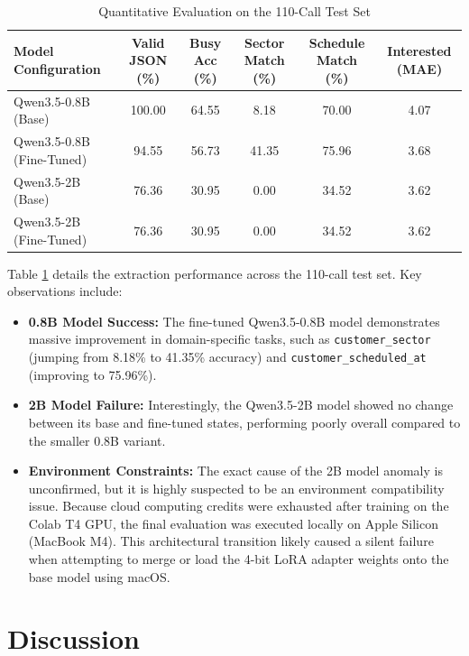 \documentclass[unnumsec,webpdf,modern,large]{oup-authoring-template}%
\theoremstyle{thmstyleone}%
\theoremstyle{thmstyletwo}%
\theoremstyle{thmstylethree}%
\begin{document}
\begin{table}[t]
\centering
\caption{Quantitative Evaluation on the 110-Call Test Set}
\begin{tabular}{@{}lccccc@{}} 
\toprule
\textbf{Model Configuration} & \textbf{Valid JSON (\%)} & \textbf{Busy Acc (\%)} & \textbf{Sector Match (\%)} & \textbf{Schedule Match (\%)} & \textbf{Interested (MAE)} \\
\midrule
Qwen3.5-0.8B (Base) & 100.00 & 64.55 & 8.18 & 70.00 & 4.07 \\
Qwen3.5-0.8B (Fine-Tuned) & 94.55 & 56.73 & 41.35 & 75.96 & 3.68 \\
\midrule
Qwen3.5-2B (Base) & 76.36 & 30.95 & 0.00 & 34.52 & 3.62 \\
Qwen3.5-2B (Fine-Tuned) & 76.36 & 30.95 & 0.00 & 34.52 & 3.62 \\
\bottomrule
\end{tabular}
\label{tab:evaluation_results}
\end{table}

Table \ref{tab:evaluation_results} details the extraction performance across the 110-call test set. Key observations include:
\begin{itemize}
    \item \textbf{0.8B Model Success:} The fine-tuned Qwen3.5-0.8B model demonstrates massive improvement in domain-specific tasks, such as \texttt{customer\_sector} (jumping from 8.18\% to 41.35\% accuracy) and \texttt{customer\_scheduled\_at} (improving to 75.96\%).
    \item \textbf{2B Model Failure:} Interestingly, the Qwen3.5-2B model showed no change between its base and fine-tuned states, performing poorly overall compared to the smaller 0.8B variant.
    \item \textbf{Environment Constraints:} The exact cause of the 2B model anomaly is unconfirmed, but it is highly suspected to be an environment compatibility issue. Because cloud computing credits were exhausted after training on the Colab T4 GPU, the final evaluation was executed locally on Apple Silicon (MacBook M4). This architectural transition likely caused a silent failure when attempting to merge or load the 4-bit LoRA adapter weights onto the base model using macOS.
\end{itemize} 

\section{Discussion}
\label{sec:discussion}
\end{document}
